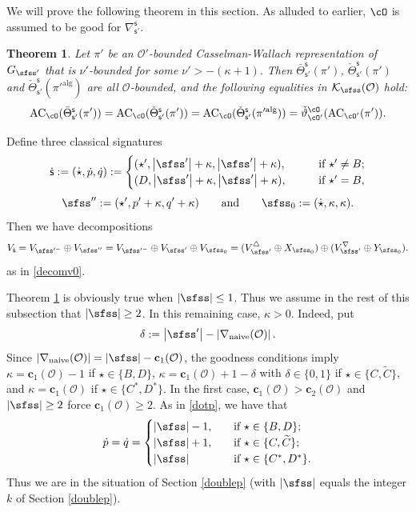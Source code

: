 \documentclass[11pt,a4paper]{amsart}
\def\abs#1{\left|{#1}\right|}
\newcommand{\CK}{{\mathcal {K}}}
\newcommand{\CO}{{\mathcal {O}}}
\def\DD{\nabla}
\numberwithin{equation}{section}
\newtheorem{thm}{Theorem}[section]
\theoremstyle{remark}
\def\Thetab{\bar{\Theta}}
\begin{document}
We will prove the following theorem in this section.
As alluded to earlier, $\cO$ is assumed to be  good for $\DD_{\mathsf s'}^{\mathsf s}$.

\begin{thm}\label{thm:GDS.AC}
  Let $\pi'$ be an $\CO'$-bounded Casselman-Wallach representation of $G_{\sfss'}$  that is  $\nu'$-bounded for some
$
  \nu'>
 -(\kappa +1).
$
Then $\Thetab_{\mathsf s'}^{\mathsf s}(\pi')$, $\check \Theta_{\mathsf s'}^{\mathsf s}(\pi')$  and $\check \Theta_{\mathsf s'}^{\mathsf s}(\pi'^{\mathrm{alg}})$ are all $\CO$-bounded, and the following equalities in $\CK_\sfss(\CO)$ hold:  
    \[
  \mathrm{AC}_{\cO}(\Thetab_{\mathsf s'}^{\mathsf s}(\pi'))=    \mathrm{AC}_{\cO}(\check \Theta_{\mathsf s'}^{\mathsf s}(\pi'))= \mathrm{AC}_{\cO}(\check \Theta_{\mathsf s'}^{\mathsf s}(\pi'^{\mathrm{alg}}))=   \check \vartheta_{\cO'}^\cO(\mathrm{AC}_{\cO'}(\pi')).
  \]
\end{thm}





  Define three classical signatures
\[
  \dsfss:=(\dot \star, \dot p, \dot q):=\begin{cases}
    (\star', \abs{\sfss'}+\kappa,  \abs{\sfss'}+\kappa), \qquad  &\textrm{if $\star'\neq B$}; \\
        (D, \abs{\sfss'}+\kappa,  \abs{\sfss'}+\kappa),\qquad  &\textrm{if $\star'=B$},
  \end{cases}
\]
\[
  \sfss'':=(\star', p'+\kappa, q'+\kappa)\qquad\textrm{and}\qquad \sfss_0:=(\dot \star, \kappa, \kappa). %
  \]
Then we have decompositions
\[
  V_{\dsfss}=V_{\sfss'^-}\oplus V_{\sfss''}= V_{\sfss'^-}\oplus V_{\sfss'}\oplus  V_{\sfss_0}= (V_{\sfss'}^\triangle \oplus X_{\sfss_0})\oplus (V_{\sfss'}^\nabla \oplus Y_{\sfss_0}).
\]
as in \eqref{decomv0}.

Theorem \ref{thm:GDS.AC} is obviously true when $\abs{\sfss}\leq 1$. Thus  we  assume in the rest of this subsection that $\abs{\sfss}\geq 2$.
In this remaining case, $\kappa>0$. Indeed, put
\[
  \delta:=\abs{\sfss'}-\abs{\DD_\mathrm{naive}(\CO)}.
\]
Since $\abs{\DD_\mathrm{naive}(\CO)}=\abs{\sfss}-\mathbf c_1(\CO)$, the goodness conditions imply $\kappa=\mathbf c_1(\CO)-1$ if $\star\in\{B,D\}$, $\kappa=\mathbf c_1(\CO)+1-\delta$ with $\delta\in\{0,1\}$ if $\star\in\{C,\widetilde C\}$, and $\kappa=\mathbf c_1(\CO)$ if $\star\in\{C^*,D^*\}$. In the first case, $\mathbf c_1(\CO)>\mathbf c_2(\CO)$ and $\abs{\sfss}\geq 2$ force $\mathbf c_1(\CO)\geq 2$.
As in \eqref{dotp}, we have that
\[
 \dot p=\dot q= \begin{cases}
 \abs{\sfss}-1,\quad   &\textrm{if } \star\in \{B,D\};\\
 \abs{\sfss}+1,  & \textrm{if $\star\in \{C, \widetilde C\}$;}\\
 \abs{\sfss} & \textrm{if $ \star\in\{C^*,D^*\}$.}
\end{cases}
\]
Thus we are in the situation of
Section \ref{doublep} (with $\abs{\sfss}$ equals the integer $k$ of Section \ref{doublep}).
\end{document}
